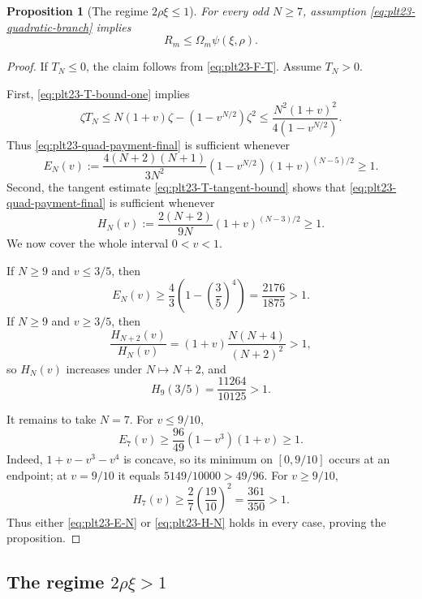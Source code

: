 \documentclass[11pt]{article}
\newtheorem{proposition}[theorem]{Proposition}
\numberwithin{equation}{section}
\begin{document}
\begin{proposition}[The regime $2\rho\xi\le1$]\label{prop:plt23-quadratic-branch}
  For every odd $N\ge7$, assumption \eqref{eq:plt23-quadratic-branch} implies
  \[
    R_m\le \Omega_m\psi(\xi,\rho).
  \]
\end{proposition}

\begin{proof}
  If $T_N\le0$, the claim follows from \eqref{eq:plt23-F-T}.  Assume
  $T_N>0$.

  First, \eqref{eq:plt23-T-bound-one} implies
  \[
    \zeta T_N
    \le N(1+v)\zeta-(1-v^{N/2})\zeta^2
    \le\frac{N^2(1+v)^2}{4(1-v^{N/2})}.
  \]
  Thus \eqref{eq:plt23-quad-payment-final} is sufficient whenever
  \begin{equation}\label{eq:plt23-E-N}
    E_N(v):=
    \frac{4(N+2)(N+1)}{3N^2}
    (1-v^{N/2})(1+v)^{(N-5)/2}\ge1.
  \end{equation}
  Second, the tangent estimate \eqref{eq:plt23-T-tangent-bound} shows that
  \eqref{eq:plt23-quad-payment-final} is sufficient whenever
  \begin{equation}\label{eq:plt23-H-N}
    H_N(v):=
    \frac{2(N+2)}{9N}(1+v)^{(N-3)/2}\ge1.
  \end{equation}
  We now cover the whole interval $0<v<1$.

  If $N\ge9$ and $v\le3/5$, then
  \[
    E_N(v)\ge\frac{4}{3}\left(1-\left(\frac{3}{5}\right)^4\right)
    =\frac{2176}{1875}>1.
  \]
  If $N\ge9$ and $v\ge3/5$, then
  \[
    \frac{H_{N+2}(v)}{H_N(v)}
    =(1+v)\frac{N(N+4)}{(N+2)^2}>1,
  \]
  so $H_N(v)$ increases under $N\mapsto N+2$, and
  \[
    H_9(3/5)=\frac{11264}{10125}>1.
  \]

  It remains to take $N=7$.  For $v\le9/10$,
  \[
    E_7(v)\ge\frac{96}{49}(1-v^3)(1+v)\ge1.
  \]
  Indeed, $1+v-v^3-v^4$ is concave, so its minimum on
  $[0,9/10]$ occurs at an endpoint; at $v=9/10$ it equals
  $5149/10000>49/96$.  For $v\ge9/10$,
  \[
    H_7(v)\ge\frac{2}{7}\left(\frac{19}{10}\right)^2
    =\frac{361}{350}>1.
  \]
  Thus either \eqref{eq:plt23-E-N} or \eqref{eq:plt23-H-N} holds in every case, proving
  the proposition.
\end{proof}

\subsection{The regime \texorpdfstring{$2\rho\xi>1$}{2 rho xi > 1}}\label{subsec:plt23-linear}
\end{document}
